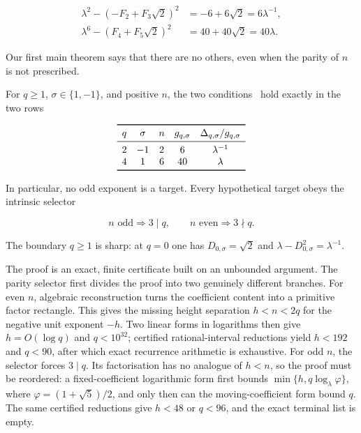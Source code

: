\begin{align}
 \lambda^2-(-F_2+F_3\sqrt2)^2
 &=-6+6\sqrt2=6\lambda^{-1},
 \label{eq:intro-example-minus}\\
 \lambda^6-(F_4+F_5\sqrt2)^2
 &=40+40\sqrt2=40\lambda.
 \label{eq:intro-example-plus}
\end{align}

Our first main theorem says that there are no others, even when the parity
of $n$ is not prescribed.

\begin{theorem}
\label{thm:classification-intro}
For $q\geqslant1$, $\sigma\in\{1,-1\}$, and positive $n$, the two conditions~ hold exactly
in the two rows

\begin{equation}
 \begin{array}{ccccc}
 \toprule
 q&\sigma&n&g_{q,\sigma}&\Delta_{q,\sigma}/g_{q,\sigma}\\
 \midrule
 2&-1&2&6&\lambda^{-1}\\
 4& 1&6&40&\lambda\\
 \bottomrule
 \end{array}
 \label{eq:two-solutions}
\end{equation}

In particular, no odd exponent is a target. Every hypothetical target obeys
the intrinsic selector

\begin{equation}
 n\text{ odd}\Longrightarrow3\mid q,
 \qquad
 n\text{ even}\Longrightarrow3\nmid q.
 \label{eq:intro-parity-selector}
\end{equation}
\end{theorem}

The boundary $q\geqslant1$ is sharp: at $q=0$ one has
$D_{0,\sigma}=\sqrt2$ and $\lambda-D_{0,\sigma}^2=\lambda^{-1}$.

The proof is an exact, finite certificate built on an unbounded argument.
The parity selector first divides the proof into two genuinely different
branches. For even $n$, algebraic reconstruction turns the coefficient
content into a primitive factor rectangle. This gives the missing height
separation $h<n<2q$ for the negative unit exponent $-h$. Two linear forms in
logarithms then give $h=O(\log q)$ and $q<10^{32}$; certified
rational-interval reductions yield $h<192$ and $q<90$, after which exact
recurrence arithmetic is exhaustive. For odd $n$, the selector forces
$3\mid q$. Its factorisation has no analogue of $h<n$, so the proof must be
reordered: a fixed-coefficient logarithmic form first bounds
$\min\{h,q\log_\lambda\varphi\}$, where $\varphi=(1+\sqrt5)/2$, and only then
can the moving-coefficient
form bound $q$. The same certified reductions give $h<48$ or $q<96$, and
the exact terminal list is empty.

